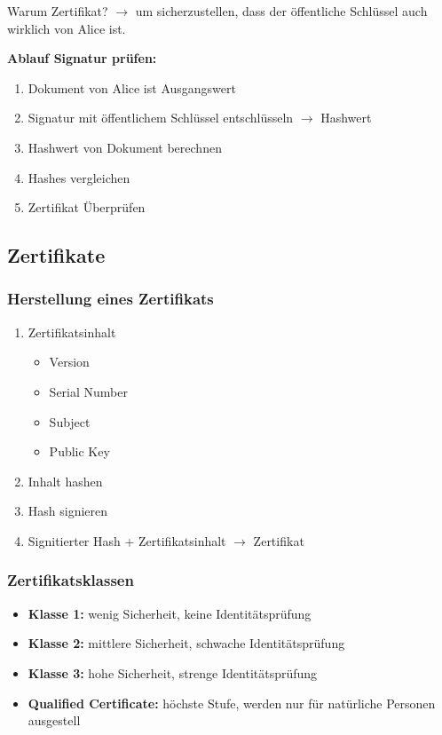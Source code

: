 \documentclass[12pt]{scrartcl}
\begin{document}
Warum Zertifikat? $\rightarrow$ um sicherzustellen, dass der öffentliche Schlüssel auch wirklich
von Alice ist.

\newpage
\textbf{Ablauf Signatur prüfen:}
\begin{enumerate}
    \item Dokument von Alice ist Ausgangswert
    \item Signatur mit öffentlichem Schlüssel entschlüsseln $\rightarrow$ Hashwert
    \item Hashwert von Dokument berechnen
    \item Hashes vergleichen
    \item Zertifikat Überprüfen
\end{enumerate}


\subsection{Zertifikate}

\subsubsection{Herstellung eines Zertifikats}


\begin{enumerate}
    \item Zertifikatsinhalt
          \begin{itemize}
              \item Version
              \item Serial Number
              \item Subject
              \item Public Key
          \end{itemize}
    \item Inhalt hashen
    \item Hash signieren
    \item Signitierter Hash + Zertifikatsinhalt $\rightarrow$ Zertifikat
\end{enumerate}

\subsubsection{Zertifikatsklassen}

\begin{itemize}
    \item \textbf{Klasse 1:} wenig Sicherheit, keine Identitätsprüfung
    \item \textbf{Klasse 2:} mittlere Sicherheit, schwache Identitätsprüfung
    \item \textbf{Klasse 3:} hohe Sicherheit, strenge Identitätsprüfung
    \item \textbf{Qualified Certificate:} höchste Stufe, werden nur für natürliche Personen ausgestell
\end{itemize}
\end{document}
